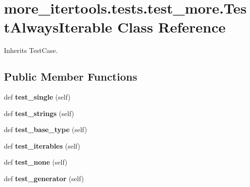 \hypertarget{classmore__itertools_1_1tests_1_1test__more_1_1_test_always_iterable}{}\section{more\+\_\+itertools.\+tests.\+test\+\_\+more.\+Test\+Always\+Iterable Class Reference}
\label{classmore__itertools_1_1tests_1_1test__more_1_1_test_always_iterable}


Inherits Test\+Case.

\subsection*{Public Member Functions}
\begin{DoxyCompactItemize}
\item 
\mbox{\label{classmore__itertools_1_1tests_1_1test__more_1_1_test_always_iterable_a7d84c707397f907e2eb09e2e6fadc5f3}} 
def {\bfseries test\+\_\+single} (self)
\item 
\mbox{\label{classmore__itertools_1_1tests_1_1test__more_1_1_test_always_iterable_abf144652b5f1b3150aa8506097b2fb1a}} 
def {\bfseries test\+\_\+strings} (self)
\item 
\mbox{\label{classmore__itertools_1_1tests_1_1test__more_1_1_test_always_iterable_a4d5fffe44487868f81bffa99e42e0c2c}} 
def {\bfseries test\+\_\+base\+\_\+type} (self)
\item 
\mbox{\label{classmore__itertools_1_1tests_1_1test__more_1_1_test_always_iterable_a2aead7742e1024e04e38a2fe81ab9674}} 
def {\bfseries test\+\_\+iterables} (self)
\item 
\mbox{\label{classmore__itertools_1_1tests_1_1test__more_1_1_test_always_iterable_aa12f775fe6a5c3350243973c01c24bc3}} 
def {\bfseries test\+\_\+none} (self)
\item 
\mbox{\label{classmore__itertools_1_1tests_1_1test__more_1_1_test_always_iterable_ab6c25acf31eff177aac3a4a2485b9ce5}} 
def {\bfseries test\+\_\+generator} (self)
\end{DoxyCompactItemize}


